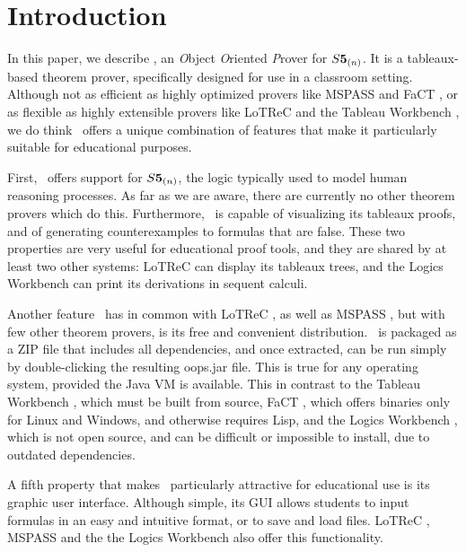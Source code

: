 \section{Introduction}
\label{sec:introduction}

In this paper, we describe \oops\/, an {\it O}bject {\it O}riented {\it P}rover for $\mathbf\mathit{S}\textbf{5}_{(n)}$. It is a tableaux-based theorem prover, specifically designed for use in a classroom setting. Although not as efficient as highly optimized provers like MSPASS \citep{mspass2000} and FaCT \citep{fact1998}, or as flexible as highly extensible provers like LoTReC \citep{lotrec2005} and the Tableau Workbench \citep{twb2009}, we do think \oops\ offers a unique combination of features that make it particularly suitable for educational purposes.

First, \oops\ offers support for $\mathbf\mathit{S}\textbf{5}_{(n)}$, the logic typically used to model human reasoning processes. As far as we are aware, there are currently no other theorem provers which do this. Furthermore, \oops\ is capable of visualizing its tableaux proofs, and of generating counterexamples to formulas that are false. These two properties are very useful for educational proof tools, and they are shared by at least two other systems: LoTReC \citep{lotrec2005} can display its tableaux trees, and the Logics Workbench \citep{heuerding1996} can print its derivations in sequent calculi.

Another feature \oops\ has in common with LoTReC \citep{lotrec2005}, as well as MSPASS \citep{mspass2000}, but with few other theorem provers, is its free and convenient distribution. \oops\ is packaged as a ZIP file that includes all dependencies, and once extracted, can be run simply by double-clicking the resulting oops.jar file. This is true for any operating system, provided the Java VM is available. This in contrast to the Tableau Workbench \citep{twb2009}, which must be built from source, FaCT \citep{fact1998}, which offers binaries only for Linux and Windows, and otherwise requires Lisp, and the Logics Workbench \citep{heuerding1996}, which is not open source, and can be difficult or impossible to install, due to outdated dependencies.

A fifth property that makes \oops\ particularly attractive for educational use is its graphic user interface. Although simple, its GUI allows students to input formulas in an easy and intuitive format, or to save and load files. LoTReC \citep{lotrec2005}, MSPASS \citep{mspass2000} and the the Logics Workbench \citep{heuerding1996} also offer this functionality.

